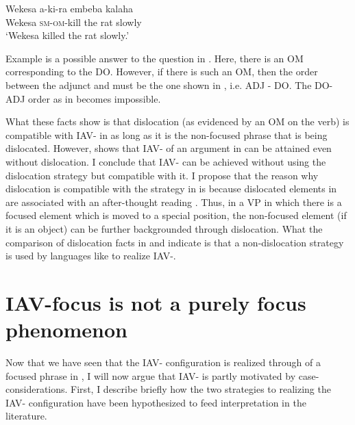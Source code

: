 \documentclass[output=paper,newtxmath,modfonts,nonflat,hidelinks]{langsci/langscibook}
\begin{document}
\ex\label{ex:selvanathan:11b}
{\gll *Wekesa  a-ki-ra   embeba  kalaha        \\
Wekesa  \textsc{sm}{}-\textsc{om}{}-kill  {the rat}    slowly\\}
\glt `Wekesa killed the rat slowly.'
\z
\z

Example  is a possible answer to the question in . Here, there is an OM corresponding to the DO. However, if there is such an OM, then the order between the adjunct and  must be the one shown in , i.e. ADJ - DO. The DO-ADJ order as in  becomes impossible.   

What these facts show is that dislocation (as evidenced by an OM on the verb) is compatible with IAV- in  as long as it is the non-focused phrase that is being dislocated. However,  shows that IAV- of an argument in  can be attained even without dislocation. I conclude that  IAV- can be achieved without using the dislocation strategy but compatible with it. I propose that the reason why dislocation is compatible with the  strategy in  is because dislocated elements in  are associated with an after-thought reading \citep{Diercks2013}. Thus, in a VP in which there is a focused element which is moved to a special position, the non-focused element (if it is an object) can be further backgrounded through dislocation. What the comparison of dislocation facts in  and  indicate is that a non-dislocation strategy is used by languages like  to realize IAV-.

\section{IAV-focus is not a purely focus phenomenon}\label{sec:selvanathan:4}

Now that we have seen that the IAV- configuration is realized through  of a focused phrase in , I will now argue that  IAV- is partly motivated by case-considerations. First, I describe briefly how the two strategies to realizing the IAV- configuration have been hypothesized to feed  interpretation in the literature.
\end{document}
